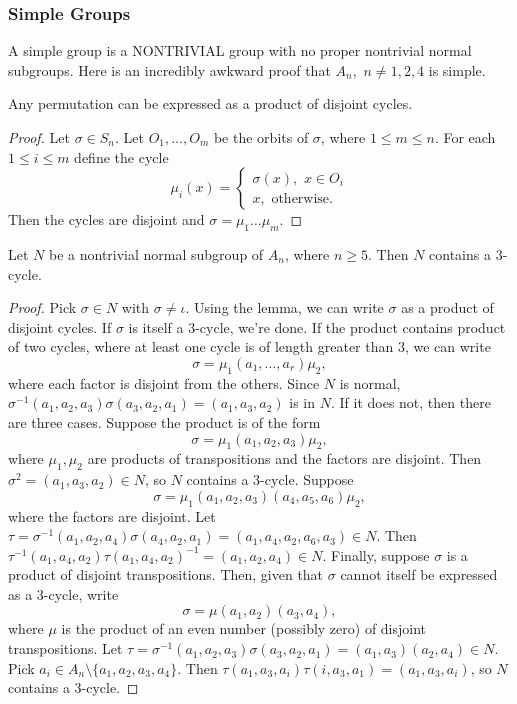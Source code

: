 \subsubsection*{Simple Groups}
A simple group is a NONTRIVIAL group with no proper nontrivial normal subgroups.
Here is an incredibly awkward proof that $A_n, \,\, n\neq 1,2,4$ is simple.
\begin{lemma}
Any permutation can be expressed as a product of disjoint cycles.
\begin{proof}
Let $\sigma \in S_n$. Let $O_1,\hdots,O_m$ be the orbits of $\sigma$, where $1 \leq m \leq n$. For each $1 \leq i \leq m$ define the cycle
$$
\mu_i(x) = \begin{cases}
\sigma(x), \,\, x \in O_i \\
x, \text{ otherwise.}
\end{cases}
$$
Then the cycles are disjoint and $\sigma = \mu_1 \hdots \mu_m$.
\end{proof}
\end{lemma}
\begin{lemma}
Let $N$ be a nontrivial normal subgroup of $A_n$, where $n \geq 5$.
Then $N$ contains a 3-cycle.
\begin{proof}
Pick $\sigma \in N$ with $\sigma \neq \iota$.
Using the lemma, we can write $\sigma$ as a product of disjoint cycles.
If $\sigma$ is itself a 3-cycle, we're done.
If the product contains product of two cycles, where at least one cycle is of length greater than 3, we can write
$$
\sigma = \mu_1 (a_1,\hdots,a_r) \mu_2,
$$
where each factor is disjoint from the others. Since $N$ is normal, $\sigma^{-1} (a_1,a_2,a_3)\sigma(a_3,a_2,a_1) = (a_1,a_3,a_2)$ is in $N$.
If it does not, then there are three cases. Suppose the product is of the form $$
\sigma = \mu_1(a_1,a_2,a_3)\mu_2,
$$
where $\mu_1,\mu_2$ are products of transpositions and the factors are disjoint. Then $\sigma^2 = (a_1,a_3,a_2) \in N$, so $N$ contains a 3-cycle.
Suppose $$\sigma = \mu_1(a_1,a_2,a_3)(a_4,a_5,a_6)\mu_2,$$
where the factors are disjoint.
Let $\tau = \sigma^{-1}(a_1,a_2,a_4)\sigma(a_4,a_2,a_1) = (a_1,a_4,a_2,a_6,a_3) \in N$.
Then $\tau^{-1}(a_1,a_4,a_2)\tau(a_1,a_4,a_2)^{-1} = (a_1,a_2,a_4) \in N$. Finally, suppose $\sigma$
is a product of disjoint transpositions. Then, given that $\sigma$ cannot itself be expressed as a 3-cycle, write $$
\sigma = \mu(a_1,a_2)(a_3,a_4),
$$
where $\mu$ is the product of an even number (possibly zero) of disjoint transpositions.
Let $\tau = \sigma^{-1}(a_1,a_2,a_3)\sigma(a_3,a_2,a_1) = (a_1,a_3)(a_2,a_4) \in N$.
Pick $a_i \in A_n \setminus \{a_1,a_2,a_3,a_4\}$.
Then $\tau (a_1,a_3,a_i) \tau (i,a_3,a_1) = (a_1,a_3,a_i)$, so $N$ contains a 3-cycle.
\end{proof}
\end{lemma}
